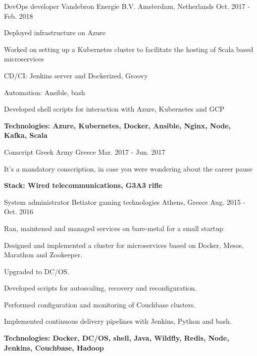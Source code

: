\begin{cventries}

\cventry
{DevOps developer} %
{Vandebron Energie B.V.} %
{Amsterdam, Netherlands} %
{Oct. 2017 - Feb. 2018} %
{ %
\begin{cvitems}
\item {Deployed infrastructure on Azure}
\item {Worked on setting up a Kubernetes cluster to facilitate the hosting of Scala based microservices}
\item {CD/CI: Jenkins server and Dockerized, Groovy}
\item {Automation: Ansible, bash}
\item {Developed shell scripts for interaction with Azure, Kubernetes and GCP}
\item {\bfseries{Technologies:} Azure, Kubernetes, Docker, Ansible, Nginx, Node, Kafka, Scala }
\end{cvitems}
}


\cventry
{Conscript} %
{Greek Army} %
{Greece} %
{Mar. 2017 - Jun. 2017} %
{ %
\begin{cvitems}
\item {It's a mandatory conscription, in case you were wondering about the career pause}
\item {\bfseries{Stack:} Wired telecommunications, G3A3 rifle}
\end{cvitems}
}


\cventry
{System administrator} %
{Betiator gaming technologies} %
{Athens, Greece} %
{Aug. 2015 - Oct. 2016} %
{ %
\begin{cvitems}
\item {Ran, maintened and managed services on bare-metal for a small startup}
\item {Designed and implemented a cluster for microservices based on Docker, Mesos, Marathon and Zookeeper.}
\item {Upgraded to DC/OS.}
\item {Developed scripts for autoscaling, recovery and reconfiguration.}
\item {Performed configuration and monitoring of Couchbase clusters.}
\item {Implemented continuous delivery pipelines with Jenkins, Python and bash.}
\item {\bfseries{Technologies:} Docker, DC/OS, shell, Java, Wildfly, Redis, Node, Jenkins, Couchbase, Hadoop}
\end{cvitems}
}


\end{cventries}
